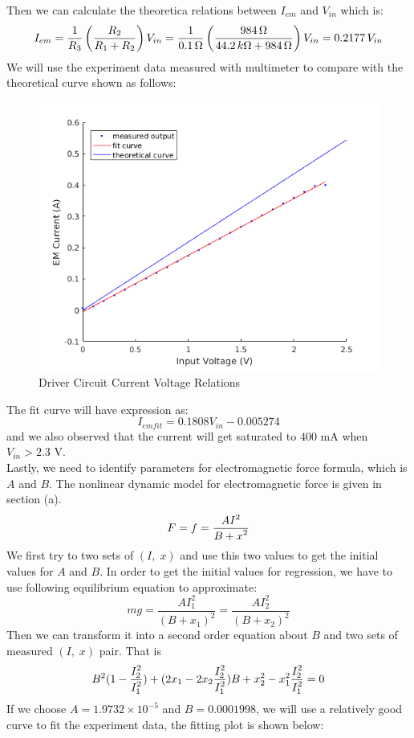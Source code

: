 \documentclass[letterpaper]{article}
\begin{document}
Then we can calculate the theoretica relations between $I_{em}$ and $V_{in}$ which is:
$$I_{em}=\frac{\displaystyle 1}{\displaystyle R_3}\left(\frac{\displaystyle R_2}{\displaystyle R_1+R_2}\right)V_{in} = \frac{\displaystyle 1}{\displaystyle 0.1 \,\Omega}\left(\frac{\displaystyle 984 \,\Omega}{\displaystyle 44.2 \,k\Omega + 984 \,\Omega}\right)V_{in} = 0.2177 \, V_{in}$$
We will use the experiment data measured with multimeter to compare with the theoretical curve shown as follows:
\begin{figure}[H]
	\centering
	\includegraphics[scale=0.45]{parameterID/Driver_Circuit/dc_plot.png}
	\caption{Driver Circuit Current Voltage Relations}
\end{figure}	
The fit curve will have expression as:
$$I_{emfit} = 0.1808V_{in} - 0.005274$$
and we also observed that the current will get saturated to $400$ mA when $V_{in} > 2.3$ V.\\
Lastly, we need to identify parameters for electromagnetic force formula, which is $A$ and $B$. The nonlinear dynamic model for electromagnetic force is given in section (a).
$$F = f = \frac{\displaystyle AI^2}{\displaystyle B + x^2}$$
We first try to two sets of $\left(I,\; x\right)$ and use this two values to get the initial values for $A$ and $B$. In order to get the initial values for regression, we have to use following equilibrium equation to approximate:
$$mg = \frac{A I_{1}^2}{(B+x_{1})^2}  = \frac{A I_{2}^2}{(B+x_{2})^2}$$
Then we can transform it into a second order equation about $B$ and two sets of measured $\left(I,\; x\right)$ pair. That is
$$B^2(1-\frac{\displaystyle I_2^2}{\displaystyle I_1^2}) + (2x_1 - 2x_2\frac{\displaystyle I_2^2}{\displaystyle I_1^2})B + x_2^2 - x_1^2\frac{\displaystyle I_2^2}{\displaystyle I_1^2} = 0$$
If we choose $A = 1.9732\times 10^{-5}$ and $B = 0.0001998$, we will use a relatively good curve to fit the experiment data, the fitting plot is shown below:
\end{document}
